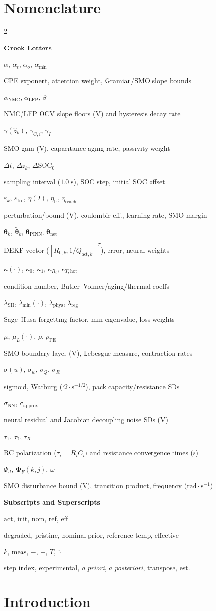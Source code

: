 \documentclass[10pt,a4paper]{article}
\newcommand{\entry}[2]{\noindent\parbox[t]{0.31\columnwidth}{\raggedright #1}\parbox[t]{0.67\columnwidth}{\raggedright #2}\par\vspace{2pt}}
\newcommand{\EntryHeading}[1]{\par\vspace{5pt}\noindent\textbf{\small #1}\par\vspace{2pt}}
\newenvironment{nomenclature}{\section*{Nomenclature}\begin{multicols}{2}\footnotesize}{\end{multicols}\vspace{0.4em}}
\begin{document}
\begin{nomenclature}
\EntryHeading{Greek Letters}
\entry{$\alpha$, $\alpha_t$, $\alpha_o$, $\alpha_{\min}$}{CPE exponent, attention weight, Gramian/SMO slope bounds}
\entry{$\alpha_{\text{NMC}}$, $\alpha_{\text{LFP}}$, $\beta$}{NMC/LFP OCV slope floors ($\text{V}$) and hysteresis decay rate}
\entry{$\gamma(\hat{z}_k)$, $\gamma_{C,i}$, $\gamma_I$}{SMO gain ($\text{V}$), capacitance aging rate, passivity weight}
\entry{$\Delta t$, $\Delta z_k$, $\Delta\text{SOC}_0$}{sampling interval ($1.0\;\text{s}$), SOC step, initial SOC offset}
\entry{$\varepsilon_k$, $\bar{\varepsilon}_{\text{tot}}$, $\eta(I)$, $\eta_{\text{lr}}$, $\eta_{\text{reach}}$}{perturbation/bound ($\text{V}$), coulombic eff., learning rate, SMO margin}
\entry{$\boldsymbol{\theta}_k$, $\tilde{\boldsymbol{\theta}}_k$, $\boldsymbol{\theta}_{\text{PINN}}$, $\boldsymbol{\theta}_{\text{net}}$}{DEKF vector ($[R_{0,k}, 1/Q_{\text{act},k}]^T$), error, neural weights}
\entry{$\kappa(\cdot)$, $\kappa_0$, $\kappa_1$, $\kappa_{R_i}$, $\kappa_{T,\text{hot}}$}{condition number, Butler--Volmer/aging/thermal coeffs}
\entry{$\lambda_{\text{SH}}$, $\lambda_{\min}(\cdot)$, $\lambda_{\text{phys}}$, $\lambda_{\text{reg}}$}{Sage--Husa forgetting factor, min eigenvalue, loss weights}
\entry{$\mu$, $\mu_L(\cdot)$, $\rho$, $\rho_{\text{PE}}$}{SMO boundary layer ($\text{V}$), Lebesgue measure, contraction rates}
\entry{$\sigma(u)$, $\sigma_w$, $\sigma_Q$, $\sigma_R$}{sigmoid, Warburg ($\Omega\cdot\text{s}^{-1/2}$), pack capacity/resistance SDs}
\entry{$\sigma_{\text{NN}}$, $\sigma_{\text{approx}}$}{neural residual and Jacobian decoupling noise SDs ($\text{V}$)}
\entry{$\tau_1$, $\tau_2$, $\tau_R$}{RC polarization ($\tau_i = R_i C_i$) and resistance convergence times ($\text{s}$)}
\entry{$\Phi_d$, $\boldsymbol{\Phi}_F(k,j)$, $\omega$}{SMO disturbance bound ($\text{V}$), transition product, frequency ($\text{rad}\cdot\text{s}^{-1}$)}

\EntryHeading{Subscripts and Superscripts}
\entry{$\text{act}$, $\text{init}$, $\text{nom}$, $\text{ref}$, $\text{eff}$}{degraded, pristine, nominal prior, reference-temp, effective}
\entry{$k$, $\text{meas}$, $-$, $+$, $T$, $\hat{\cdot}$}{step index, experimental, \emph{a priori}, \emph{a posteriori}, transpose, est.}
\end{nomenclature}

\section{Introduction}
\end{document}
